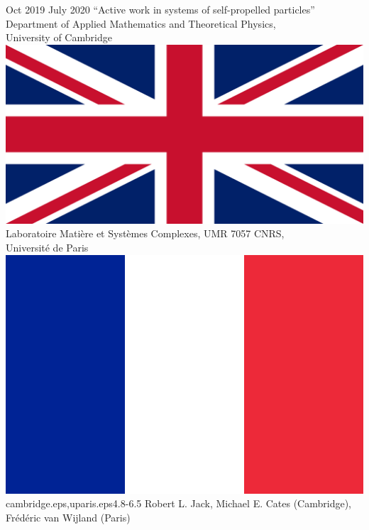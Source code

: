 \documentclass[letterpaper]{cvtemplate_en} %
\begin{document}
\begin{cvbody}

\cvitem
	{Oct 2019}
	{July 2020}
  {``Active work in systems of self-propelled particles''}
  {Department of Applied Mathematics and Theoretical Physics,\\ University of Cambridge \includegraphics[height=0.8\myheight]{uk}\\
	Laboratoire Mati\`ere et Syst\`emes Complexes, UMR 7057 CNRS,\\ Universit\'e de Paris \includegraphics[height=0.8\myheight]{fr}}
  {cambridge.eps,uparis.eps}{4.8}{-6.5}
	{Robert L. Jack, Michael E. Cates (Cambridge),\\ Fr\'ed\'eric van Wijland (Paris)}
  {\\}


\end{cvbody}
\end{document}
